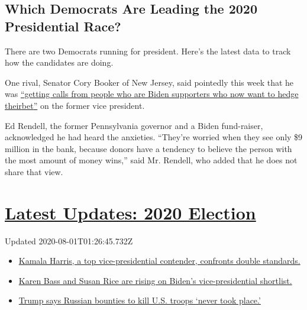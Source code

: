 \hypertarget{which-democrats-are-leading-the-2020-presidential-race}{%
\subsection{Which Democrats Are Leading the 2020 Presidential
Race?}\label{which-democrats-are-leading-the-2020-presidential-race}}

There are two Democrats running for president. Here's the latest data to
track how the candidates are doing.

One rival, Senator Cory Booker of New Jersey, said pointedly this week
that he was
\href{https://www.cnn.com/2019/10/23/politics/cory-booker-national-press-club-speech/index.html}{``getting
calls from people who are Biden supporters who now want to hedge
their}\href{https://www.cnn.com/2019/10/23/politics/cory-booker-national-press-club-speech/index.html}{bet}\href{https://www.cnn.com/2019/10/23/politics/cory-booker-national-press-club-speech/index.html}{''}
on the former vice president.

Ed Rendell, the former Pennsylvania governor and a Biden fund-raiser,
acknowledged he had heard the anxieties. ``They're worried when they see
only \$9 million in the bank, because donors have a tendency to believe
the person with the most amount of money wins,'' said Mr. Rendell, who
added that he does not share that view.

\hypertarget{latest-updates-2020-election}{%
\section{\texorpdfstring{\href{https://www.nytimes.com/2020/07/31/us/elections/biden-vs-trump.html?action=click\&pgtype=Article\&state=default\&region=MAIN_CONTENT_1\&context=storylines_live_updates}{Latest
Updates: 2020
Election}}{Latest Updates: 2020 Election}}\label{latest-updates-2020-election}}

Updated 2020-08-01T01:26:45.732Z

\begin{itemize}
\tightlist
\item
  \href{https://www.nytimes.com/2020/07/31/us/elections/biden-vs-trump.html?action=click\&pgtype=Article\&state=default\&region=MAIN_CONTENT_1\&context=storylines_live_updates\#link-29fdff45}{Kamala
  Harris, a top vice-presidential contender, confronts double
  standards.}
\item
  \href{https://www.nytimes.com/2020/07/31/us/elections/biden-vs-trump.html?action=click\&pgtype=Article\&state=default\&region=MAIN_CONTENT_1\&context=storylines_live_updates\#link-13ec3d9c}{Karen
  Bass and Susan Rice are rising on Biden's vice-presidential
  shortlist.}
\item
  \href{https://www.nytimes.com/2020/07/31/us/elections/biden-vs-trump.html?action=click\&pgtype=Article\&state=default\&region=MAIN_CONTENT_1\&context=storylines_live_updates\#link-49e9a016}{Trump
  says Russian bounties to kill U.S. troops `never took place.'}
\end{itemize}

